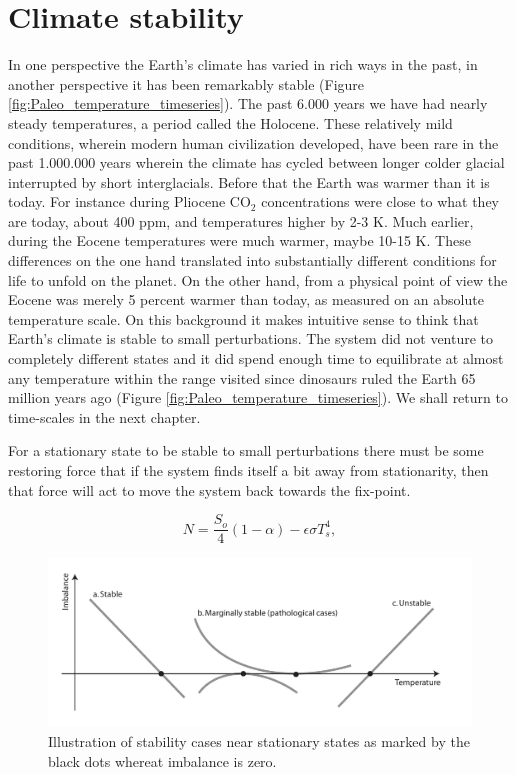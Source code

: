 \documentclass[12pt]{book}
\begin{document}
\section{Climate stability}
In one perspective the Earth's climate has varied in rich ways in the past, in another perspective it has been remarkably stable (Figure \ref{fig:Paleo_temperature_timeseries}). The past 6.000 years we have had nearly steady temperatures, a period called the Holocene. These relatively mild conditions, wherein modern human civilization developed, have been rare in the past 1.000.000 years wherein the climate has cycled between longer colder glacial interrupted by short interglacials. Before that the Earth was warmer than it is today. For instance during Pliocene CO$_2$ concentrations were close to what they are today, about 400 ppm, and temperatures higher by 2-3 K. Much earlier, during the Eocene temperatures were much warmer, maybe 10-15 K. These differences on the one hand translated into substantially different conditions for life to unfold on the planet. On the other hand, from a physical point of view the Eocene was merely 5 percent warmer than today, as measured on an absolute temperature scale. 
On this background it makes intuitive sense to think that Earth's climate is stable to small perturbations. The system did not venture to completely different states and it did spend enough time to equilibrate at almost any temperature within the range visited since dinosaurs ruled the Earth 65 million years ago (Figure \ref{fig:Paleo_temperature_timeseries}). We shall return to time-scales in the next chapter. 

For a stationary state to be stable to small perturbations there must be some restoring force that if the system finds itself a bit away from stationarity, then that force will act to move the system back towards the fix-point. 

\begin{equation}
N = \frac{S_o}{4}(1-\alpha) - \epsilon \sigma T_s^4,
\end{equation}

\begin{figure}
\begin{center}
\includegraphics[width=17 cm]{../illustrations/Feedback_stability_cases.pdf}
\end{center}
\caption{ Illustration of stability cases near stationary states as marked by the black dots whereat imbalance is zero.  } 
\label{fig:feedback_stability_cases}
\end{figure}
\end{document}
